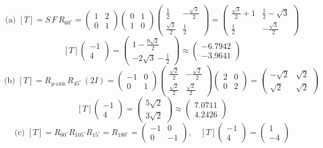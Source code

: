 \[ \text{(a) }[T]=S\,F\,R_{60^\circ}=\begin{pmatrix}1 & 2 \\ 0 & 1\end{pmatrix}\begin{pmatrix}0 & 1 \\ 1 & 0\end{pmatrix}\begin{pmatrix}\frac{1}{2} & - \frac{\sqrt{3}}{2} \\ \frac{\sqrt{3}}{2} & \frac{1}{2}\end{pmatrix}=\begin{pmatrix}\frac{\sqrt{3}}{2} + 1 & \frac{1}{2} - \sqrt{3} \\ \frac{1}{2} & - \frac{\sqrt{3}}{2}\end{pmatrix} \]
\[ [T]\begin{pmatrix}-1 \\ 4\end{pmatrix}=\begin{pmatrix}1 - \frac{9 \sqrt{3}}{2} \\ - 2 \sqrt{3} - \frac{1}{2}\end{pmatrix}\approx\begin{pmatrix}-6.7942 \\ -3.9641\end{pmatrix} \]
\[ \text{(b) }[T]=R_{y\text{-axis}}\,R_{45^\circ}\,(2I)=\begin{pmatrix}-1 & 0 \\ 0 & 1\end{pmatrix}\begin{pmatrix}\frac{\sqrt{2}}{2} & - \frac{\sqrt{2}}{2} \\ \frac{\sqrt{2}}{2} & \frac{\sqrt{2}}{2}\end{pmatrix}\begin{pmatrix}2 & 0 \\ 0 & 2\end{pmatrix}=\begin{pmatrix}- \sqrt{2} & \sqrt{2} \\ \sqrt{2} & \sqrt{2}\end{pmatrix} \]
\[ [T]\begin{pmatrix}-1 \\ 4\end{pmatrix}=\begin{pmatrix}5 \sqrt{2} \\ 3 \sqrt{2}\end{pmatrix}\approx\begin{pmatrix}7.0711 \\ 4.2426\end{pmatrix} \]
\[ \text{(c) }[T]=R_{60^\circ}R_{105^\circ}R_{15^\circ}=R_{180^\circ}=\begin{pmatrix}-1 & 0 \\ 0 & -1\end{pmatrix},\quad [T]\begin{pmatrix}-1 \\ 4\end{pmatrix}=\begin{pmatrix}1 \\ -4\end{pmatrix} \]
